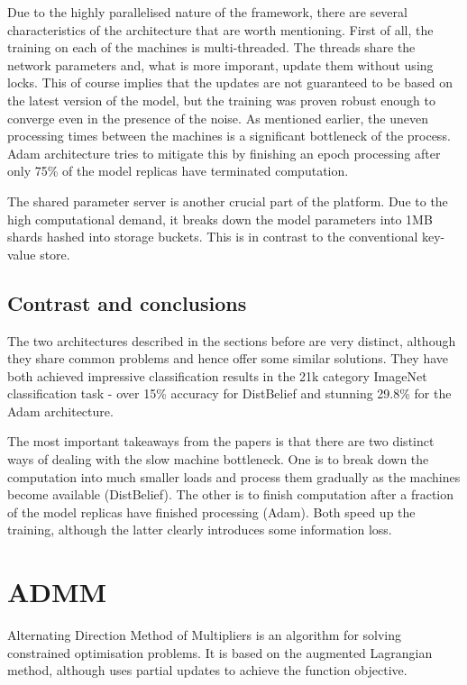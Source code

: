 \documentclass[a4paper, 12pt]{article}
\numberwithin{equation}{section}
\begin{document}
	Due to the highly parallelised nature of the framework, there are several characteristics of the architecture that are worth mentioning. First of all, the training on each of the machines is multi-threaded. The threads share the network parameters and, what is more imporant, update them without using locks. This of course implies that the updates are not guaranteed to be based on the latest version of the model, but the training was proven robust enough to converge even in the presence of the noise. As mentioned earlier, the uneven processing times between the machines is a significant bottleneck of the process. Adam architecture tries to mitigate this by finishing an epoch processing after only 75\% of the model replicas have terminated computation.
	
	The shared parameter server is another crucial part of the platform. Due to the high computational demand, it breaks down the model parameters into 1MB shards hashed into storage buckets. This is in contrast to the conventional key-value store.
	
	\subsection{Contrast and conclusions}
	
	The two architectures described in the sections before are very distinct, although they share common problems and hence offer some similar solutions. They have both achieved impressive classification results in the 21k category ImageNet classification task - over 15\% accuracy for DistBelief and stunning 29.8\% for the Adam architecture.
	
	The most important takeaways from the papers is that there are two distinct ways of dealing with the slow machine bottleneck. One is to break down the computation into much smaller loads and process them gradually as the machines become available (DistBelief). The other is to finish computation after a fraction of the model replicas have finished processing (Adam). Both speed up the training, although the latter clearly introduces some information loss.

	
	\section{ADMM}
	\label{ADMM}
	
	Alternating Direction Method of Multipliers is an algorithm for solving constrained optimisation problems. It is based on the augmented Lagrangian method, although uses partial updates to achieve the function objective.
	
\end{document}
